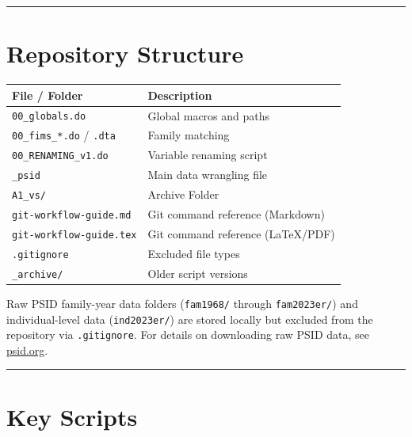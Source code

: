 \documentclass[12pt]{article}
\begin{document}
\noindent\rule{\textwidth}{0.4pt}

\section*{Repository Structure}

\begin{center}
\begin{tabular}{ll}
\toprule
\textbf{File / Folder} & \textbf{Description} \\
\midrule
\texttt{00\_globals.do}         & Global macros and paths \\
\texttt{00\_fims\_*.do} / \texttt{.dta} & Family matching \\
\texttt{00\_RENAMING\_v1.do}    & Variable renaming script \\
\texttt{\_psid}                 & Main data wrangling file \\
\texttt{A1\_vs/}                & Archive Folder \\
\texttt{git-workflow-guide.md}  & Git command reference (Markdown) \\
\texttt{git-workflow-guide.tex} & Git command reference (\LaTeX/PDF) \\
\texttt{.gitignore}             & Excluded file types \\
\texttt{\_archive/}             & Older script versions \\
\bottomrule
\end{tabular}
\end{center}

Raw PSID family-year data folders (\texttt{fam1968/} through \texttt{fam2023er/}) and individual-level data (\texttt{ind2023er/}) are stored locally but excluded from the repository via \texttt{.gitignore}. For details on downloading raw PSID data, see \href{https://psidonline.isr.umich.edu/}{psid.org}.

\noindent\rule{\textwidth}{0.4pt}

\section*{Key Scripts}
\end{document}
